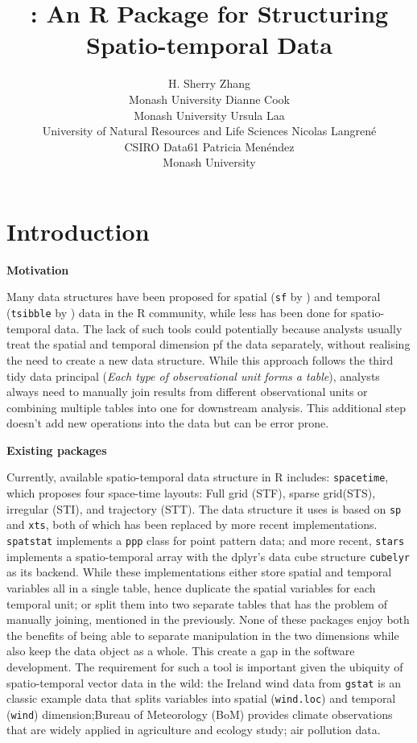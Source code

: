 \documentclass[
]{jss}
\author{
H. Sherry Zhang\\Monash University \And Dianne Cook\\Monash University
\AND Ursula Laa\\University of Natural Resources and Life Sciences
\AND Nicolas Langrené\\CSIRO Data61 \AND Patricia
Menéndez\\Monash University \AND
}
\title{\pkg{cubble}: An R Package for Structuring Spatio-temporal Data}
\begin{document}
\newpage

\hypertarget{introduction}{%
\section{Introduction}\label{introduction}}

\textbf{Motivation}

Many data structures have been proposed for spatial (\texttt{sf} by
\citet{sf}) and temporal (\texttt{tsibble} by \citet{tsibble}) data in
the R community, while less has been done for spatio-temporal data. The
lack of such tools could potentially because analysts usually treat the
spatial and temporal dimension pf the data separately, without realising
the need to create a new data structure. While this approach follows the
third tidy data principal \citep{tidydata} (\emph{Each type of
observational unit forms a table}), analysts always need to manually
join results from different observational units or combining multiple
tables into one for downstream analysis. This additional step doesn't
add new operations into the data but can be error prone. \newline

\textbf{Existing packages}

Currently, available spatio-temporal data structure in R includes:
\texttt{spacetime}\citep{spacetime}, which proposes four space-time
layouts: Full grid (STF), sparse grid(STS), irregular (STI), and
trajectory (STT). The data structure it uses is based on \texttt{sp}
\citep{sp} and \texttt{xts}\citep{xts}, both of which has been replaced
by more recent implementations. \texttt{spatstat} \citep{spatstat}
implements a \texttt{ppp} class for point pattern data; and more recent,
\texttt{stars} \citep{stars} implements a spatio-temporal array with the
dplyr's data cube structure \texttt{cubelyr} \citep{cubelyr} as its
backend. While these implementations either store spatial and temporal
variables all in a single table, hence duplicate the spatial variables
for each temporal unit; or split them into two separate tables that has
the problem of manually joining, mentioned in the previously. None of
these packages enjoy both the benefits of being able to separate
manipulation in the two dimensions while also keep the data object as a
whole. This create a gap in the software development. The requirement
for such a tool is important given the ubiquity of spatio-temporal
vector data in the wild: the Ireland wind data from \texttt{gstat} is an
classic example data that splits variables into spatial
(\texttt{wind.loc}) and temporal (\texttt{wind}) dimension;Bureau of
Meteorology (BoM) provides climate observations that are widely applied
in agriculture and ecology study; air pollution data. \newline
\end{document}
